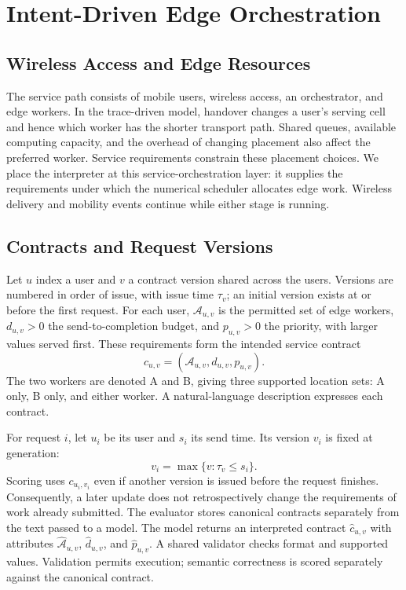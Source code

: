 \section{Intent-Driven Edge Orchestration}
\label{sec:system}
\subsection{Wireless Access and Edge Resources}
The service path consists of mobile users, wireless access, an orchestrator, and edge workers. In the trace-driven model, handover changes a user's serving cell and hence which worker has the shorter transport path. Shared queues, available computing capacity, and the overhead of changing placement also affect the preferred worker. Service requirements constrain these placement choices. We place the interpreter at this service-orchestration layer: it supplies the requirements under which the numerical scheduler allocates edge work. Wireless delivery and mobility events continue while either stage is running.

\subsection{Contracts and Request Versions}
Let $u$ index a user and $v$ a contract version shared across the users. Versions are numbered in order of issue, with issue time $\tau_v$; an initial version exists at or before the first request. For each user, $\mathcal{A}_{u,v}$ is the permitted set of edge workers, $d_{u,v}>0$ the send-to-completion budget, and $p_{u,v}>0$ the priority, with larger values served first. These requirements form the intended service contract
\begin{equation}
c_{u,v}=(\mathcal{A}_{u,v},d_{u,v},p_{u,v}).
\label{eq:contract}
\end{equation}
The two workers are denoted A and B, giving three supported location sets: A only, B only, and either worker. A natural-language description expresses each contract.

For request $i$, let $u_i$ be its user and $s_i$ its send time. Its version $v_i$ is fixed at generation:
\begin{equation}
v_i=\max\{v:\tau_v\le s_i\}.
\end{equation}
Scoring uses $c_{u_i,v_i}$ even if another version is issued before the request finishes. Consequently, a later update does not retrospectively change the requirements of work already submitted. The evaluator stores canonical contracts separately from the text passed to a model. The model returns an interpreted contract $\widehat c_{u,v}$ with attributes $\widehat{\mathcal A}_{u,v}$, $\widehat d_{u,v}$, and $\widehat p_{u,v}$. A shared validator checks format and supported values. Validation permits execution; semantic correctness is scored separately against the canonical contract.

